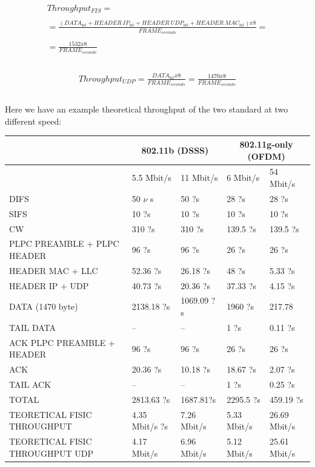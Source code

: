 	\begin{gather*}
		Throughput_{FIS} = \\\\
		= \frac{ ( DATA_{bit} + HEADER\ IP_{bit} + HEADER\ UDP_{bit} + HEADER\ MAC_{bit} ) x 8 }{ FRAME_{seconds} } = \\\\
		= \frac{ 1532 x 8 }{  FRAME_{seconds} } \\\\
	\end{gather*}
	
	\begin{gather*}
		Throughput_{UDP} = \frac{ DATA_{bit} x 8 }{ FRAME_{seconds} } = \frac{ 1470 x 8 }{  FRAME_{seconds} } \\\\
	\end{gather*}
	
	Here we have an example theoretical throughput of the two standard at two different speed:
	
	\begin{table}[h!]
		\begin{tabularx}{15cm}{ | X | X | X | X | X | }
			\hline
				 & \multicolumn{2}{|c|}{ 802.11b (DSSS)} & \multicolumn{2}{|c|}{ 802.11g-only (OFDM)} \\
				 \hline
				 & 5.5 Mbit/s & 11 Mbit/s & 6 Mbit/s & 54 Mbit/s \\
			\hline
				DIFS & 50 $\nu$ s & 50 ?s & 28 ?s & 28 ?s \\
			\hline
				SIFS & 10 ?s & 10 ?s & 10 ?s & 10 ?s \\
			\hline
				CW & 310 ?s & 310 ?s & 139.5 ?s & 139.5 ?s \\
			\hline
				PLPC PREAMBLE + PLPC HEADER & 96 ?s & 96 ?s & 26 ?s & 26 ?s \\
			\hline
				HEADER MAC + LLC & 52.36 ?s & 26.18 ?s & 48 ?s & 5.33 ?s \\
			\hline
				HEADER IP + UDP & 40.73 ?s & 20.36 ?s & 37.33 ?s & 4.15 ?s \\
			\hline
				DATA (1470 byte)& 2138.18 ?s & 1069.09 ?s & 1960 ?s & 217.78 \\
			\hline
				TAIL DATA & -- & -- & 1 ?s & 0.11 ?s \\
			\hline
				ACK PLPC PREAMBLE + HEADER & 96 ?s & 96 ?s & 26 ?s & 26 ?s \\
			\hline
				ACK & 20.36 ?s & 10.18 ?s & 18.67 ?s & 2.07 ?s \\
			\hline
				TAIL ACK & -- & -- & 1 ?s & 0.25 ?s \\
			\hline
			\hline
				TOTAL & 2813.63 ?s & 1687.81?s & 2295.5 ?s & 459.19 ?s \\
			\hline
			\hline
				TEORETICAL FISIC THROUGHPUT & 4.35 Mbit/s ?s & 7.26 Mbit/s & 5.33 Mbit/s & 26.69 Mbit/s \\
			\hline
			\hline
				TEORETICAL FISIC THROUGHPUT UDP & 4.17 Mbit/s & 6.96 Mbit/s & 5.12 Mbit/s & 25.61 Mbit/s \\
			\hline
			
		\end{tabularx}
	\end{table}
	
